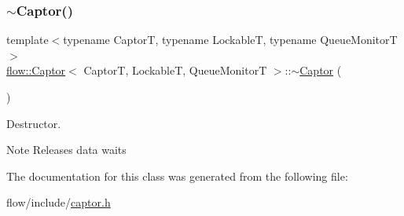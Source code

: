\subsubsection{\texorpdfstring{$\sim$\+Captor()}{~Captor()}}
{\footnotesize\ttfamily template$<$typename CaptorT, typename LockableT, typename Queue\+MonitorT$>$ \\
\hyperlink{classflow_1_1_captor}{flow\+::\+Captor}$<$ CaptorT, LockableT, Queue\+MonitorT $>$\+::$\sim$\hyperlink{classflow_1_1_captor}{Captor} (\begin{DoxyParamCaption}{ }\end{DoxyParamCaption})}



Destructor. 

\begin{DoxyNote}{Note}
Releases data waits 
\end{DoxyNote}


The documentation for this class was generated from the following file\+:\begin{DoxyCompactItemize}
\item 
flow/include/\hyperlink{captor_8h}{captor.\+h}\end{DoxyCompactItemize}

